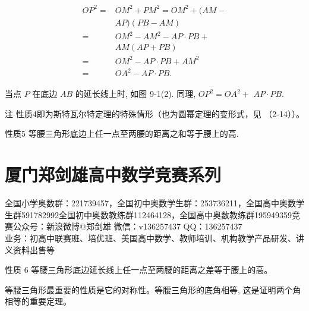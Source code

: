 \documentclass[10pt]{article}
\begin{document}
\begin{align*}
\begin{aligned}
O P^{2}= & O M^{2}+P M^{2}=O M^{2}+(A M- \\
& A P)(P B-A M) \\
= & O M^{2}-A M^{2}-A P \cdot P B+ \\
& A M(A P+P B) \\
= & O M^{2}-A P \cdot P B+A M^{2} \\
= & O A^{2}-A P \cdot P B .
\end{aligned}
\end{align*}

当点 $P$ 在底边 $A B$ 的延长线上时, 如图 9-1(2). 同理, $O P^{2}=O A^{2}+$ $A P \cdot P B$.

注 性质4即为斯特瓦尔特定理的特殊情形（也为圆幂定理的变形式，见 （2-14））。

性质5 等腰三角形底边上任一点至两腰的距离之和等于腰上的高.

\section*{厦门郑剑雄高中数学竞赛系列}
全国小学奥数群：221739457，全国初中奥数学生群：253736211，全国高中奥数学生群591782992全国初中奥数教练群112464128，全国高中奥数教练群195949359竞赛公众号：新浪微博@郑剑雄 微信：v136257437 QQ：136257437\\
业务：初高中联赛班、培优班、美国高中数学、教师培训、机构教学产品研发、讲义资料出售等

性质 6 等腰三角形底边延长线上任一点至两腰的距离之差等于腰上的高。

等腰三角形最重要的性质是它的对称性。等腰三角形的底角相等, 这是证明两个角相等的重要定理。
\end{document}
